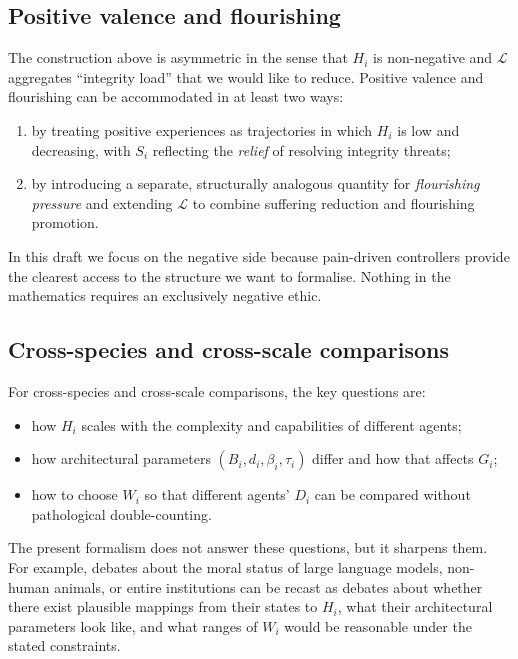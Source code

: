 \documentclass[11pt]{article}
\begin{document}
\subsection{Positive valence and flourishing}

The construction above is asymmetric in the sense that $H_i$ is non-negative and $\mathcal L$ aggregates ``integrity load'' that we would like to reduce. Positive valence and flourishing can be accommodated in at least two ways:
\begin{enumerate}
  \item by treating positive experiences as trajectories in which $H_i$ is low and decreasing, with $S_i$ reflecting the \emph{relief} of resolving integrity threats;
  \item by introducing a separate, structurally analogous quantity for \emph{flourishing pressure} and extending $\mathcal L$ to combine suffering reduction and flourishing promotion.
\end{enumerate}

In this draft we focus on the negative side because pain-driven controllers provide the clearest access to the structure we want to formalise. Nothing in the mathematics requires an exclusively negative ethic.

\subsection{Cross-species and cross-scale comparisons}

For cross-species and cross-scale comparisons, the key questions are:
\begin{itemize}
  \item how $H_i$ scales with the complexity and capabilities of different agents;
  \item how architectural parameters $(B_i,d_i,\beta_i,\tau_i)$ differ and how that affects $G_i$;
  \item how to choose $W_i$ so that different agents' $D_i$ can be compared without pathological double-counting.
\end{itemize}

The present formalism does not answer these questions, but it sharpens them. For example, debates about the moral status of large language models, non-human animals, or entire institutions can be recast as debates about whether there exist plausible mappings from their states to $H_i$, what their architectural parameters look like, and what ranges of $W_i$ would be reasonable under the stated constraints.
\end{document}
